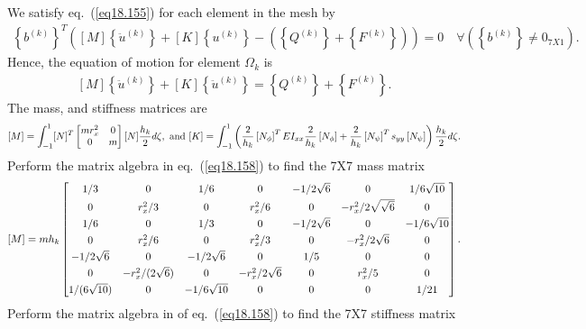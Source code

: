 \documentclass{AeroStructure-ERJohnson}
\begin{document}
We satisfy eq.~(\ref{eq18.155}) for each element in the mesh by
\begin{align}\label{eq18.156}
\left\{b^{(k)}\right\}^{T}\left([M]\left\{\ddot{u}^{(k)}\right\}+[K]\left\{u^{(k)}\right\}-\left(\left\{Q^{(k)}\right\}+\left\{F^{(k)}\right\}\right)\right)=0 \quad \forall\left(\left\{b^{(k)}\right\} \neq 0_{7 X 1}\right).
\end{align}
Hence, the equation of motion for element $\Omega_k$ is
\begin{align}\label{eq18.157}
[M]\left\{\ddot{u}^{(k)}\right\}+[K]\left\{\ddot{u}^{(k)}\right\}=\left\{Q^{(k)}\right\}+\left\{F^{(k)}\right\}.
\end{align}
The mass, and stiffness matrices are
\begin{align}\label{eq18.158}
[M]=\int_{-1}^{1}[N]^{T}\left[\begin{array}{@{}cc@{}}m r_{x}^{2} & 0 \\0 & m\end{array}\right][N] \frac{h_{k}}{2} d \zeta,\text{ and }[K]=\int_{-1}^{1}\left(\frac{2}{h_{k}}\left[N_{\phi}\right]^{T} E I_{x x} \frac{2}{h_{k}}\left[N_{\phi}\right]+\frac{2}{h_{k}}\left[N_{\psi}\right]^{T} s_{y y}\left[N_{\psi}\right]\right) \frac{h_{k}}{2} d \zeta.
\end{align}
Perform the matrix algebra in eq.~(\ref{eq18.158}) to find the 7X7 mass matrix\vspace*{-0.6pc}
\begin{align}\label{eq18.159}
[M]=m h_{k}\left[\begin{array}{@{}ccccccc@{}}
1/3 & 0 & 1/6 & 0 & -1/2 \sqrt{6} & 0 & 1/6 \sqrt{10} \\[3pt]
0 & r_{x}^{2}/3 & 0 & r_{x}^{2}/6 & 0 & -r_{x}^{2}/2 \sqrt{\sqrt{6}} & 0 \\[3pt]
1/6 & 0 & 1/3 & 0 & -1/2 \sqrt{6} & 0 & -1/6 \sqrt{10} \\[3pt]
0 & r_{x}^{2}/6 & 0 & r_{x}^{2}/3 & 0 & -r_{x}^{2}/2 \sqrt{6} & 0 \\[3pt]
-1/2 \sqrt{6} & 0 & -1/2 \sqrt{6} & 0 & 1/5 & 0 & 0 \\[3pt]
0 & -r_{x}^{2} /(2 \sqrt{6}) & 0 & -r_{x}^{2}/2 \sqrt{6} & 0 & r_{x}^{2}/5 & 0 \\[3pt]
1 /(6 \sqrt{10}) & 0 & -1/6 \sqrt{10} & 0 & 0 & 0 & 1/21\end{array}\right].
\end{align}
Perform the matrix algebra in of eq.~(\ref{eq18.158}) to find the 7X7 stiffness matrix\vspace*{-0.6pc}
\end{document}
